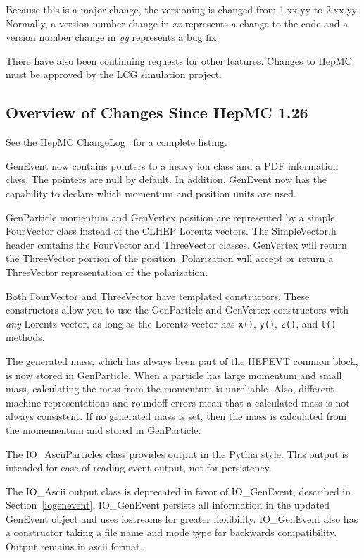\documentclass[11pt,letterpaper]{article}
\begin{document}
Because this is a major change, the versioning is changed 
from 1.xx.yy to 2.xx.yy.  Normally, a version number change in \emph{xx} 
represents a change to the code and a version number change in \emph{yy}
represents a bug fix.

There have also been continuing requests for other features.
Changes to HepMC must be approved by the LCG simulation project.  

%
%

\subsection{Overview of Changes Since HepMC 1.26}

See the HepMC ChangeLog~\cite{changelog} for a complete listing.

GenEvent now contains pointers to a heavy ion class and a PDF information class.
The pointers are null by default.  
In addition, GenEvent now has the capability to declare which
momentum and position units are used.

GenParticle momentum and GenVertex position are represented by a simple FourVector 
class instead of the CLHEP Lorentz vectors.  
The SimpleVector.h header contains the FourVector and ThreeVector classes.
GenVertex will return the ThreeVector portion of the position.
Polarization will accept or return a ThreeVector representation 
of the polarization.

Both FourVector and ThreeVector have templated constructors.  
These constructors allow you to use the GenParticle and GenVertex constructors
with \emph{any} Lorentz vector, as long as the Lorentz vector has 
\verb!x()!, \verb!y()!, \verb!z()!, and \verb!t()! methods.

The generated mass, which has always been part of the HEPEVT common block, 
is now stored in GenParticle.  
When a particle has large momentum and small mass, 
calculating the mass from the momentum is unreliable.
Also, different machine representations and roundoff errors mean that
a calculated mass is not always consistent.
If no generated mass is set, then the mass is calculated from the momementum 
and stored in GenParticle.

The IO\_AsciiParticles class provides output in the Pythia style.
This output is intended for ease of reading event output, not for persistency.

The IO\_Ascii output class is deprecated in favor of IO\_GenEvent, 
described in Section~\ref{iogenevent}.  
IO\_GenEvent persists all information in the updated GenEvent object and
uses iostreams for greater flexibility.  IO\_GenEvent also has a 
constructor taking a file name and mode type for backwards compatibility. 
Output remains in ascii format.
\end{document}
